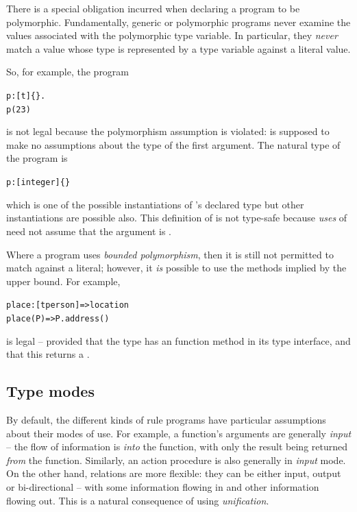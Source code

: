 \begin{aside}
There is a special obligation incurred when declaring a program to be polymorphic. Fundamentally, generic or polymorphic programs never examine the values associated with the polymorphic type variable. In particular, they \emph{never} match a value whose type is represented by a type variable against a literal value.

So, for example, the program
\begin{alltt}
p:[t]\{\}.
p(23)
\end{alltt}
is not legal because the polymorphism assumption is violated:  is supposed to make no assumptions about the type of the first argument. The natural type of the  program is 
\begin{alltt}
p:[integer]\{\}
\end{alltt}
which is one of the possible instantiations of 's declared type but other instantiations are possible also. This definition of  is not type-safe because \emph{uses} of  need not assume that the argument is .

Where a program uses \emph{bounded polymorphism}, then it is still not permitted to match against a literal; however, it \emph{is} possible to use the methods implied by the upper bound. For example,
\begin{alltt}
place:[t\impl{}person] => location
place(P) => P.address()
\end{alltt}
is legal -- provided that the  type has an  function method in its type interface, and that this returns a .
\end{aside}


\subsection{Type modes}
\label{type:modes}

By default, the different kinds of rule programs have particular assumptions about their modes of use. For example, a function's arguments are generally \emph{input} -- the flow of information is \emph{into} the function, with only the result being returned \emph{from} the function. Similarly, an action procedure is also generally in \emph{input} mode. On the other hand, relations are more flexible: they can be either input, output or bi-directional -- with some information flowing in and other information flowing out. This is a natural consequence of using \emph{unification}.

